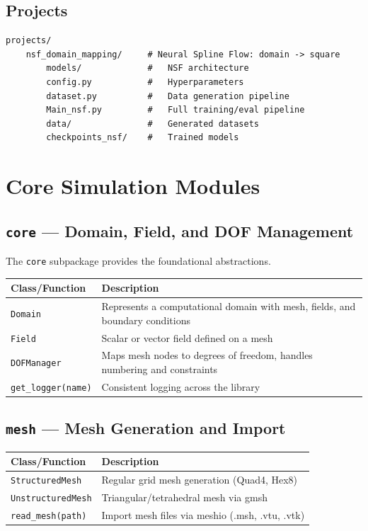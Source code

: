 \documentclass[11pt,a4paper]{report}
\begin{document}
\section{Projects}

\begin{lstlisting}[style=bash,numbers=none]
projects/
    nsf_domain_mapping/     # Neural Spline Flow: domain -> square
        models/             #   NSF architecture
        config.py           #   Hyperparameters
        dataset.py          #   Data generation pipeline
        Main_nsf.py         #   Full training/eval pipeline
        data/               #   Generated datasets
        checkpoints_nsf/    #   Trained models
\end{lstlisting}

\chapter{Core Simulation Modules}

\section{\texttt{core} --- Domain, Field, and DOF Management}

The \texttt{core} subpackage provides the foundational abstractions.

\begin{longtable}{lp{9cm}}
\toprule
\textbf{Class/Function} & \textbf{Description} \\
\midrule
\texttt{Domain} & Represents a computational domain with mesh, fields, and boundary conditions \\
\texttt{Field} & Scalar or vector field defined on a mesh \\
\texttt{DOFManager} & Maps mesh nodes to degrees of freedom, handles numbering and constraints \\
\texttt{get\_logger(name)} & Consistent logging across the library \\
\bottomrule
\end{longtable}

\section{\texttt{mesh} --- Mesh Generation and Import}

\begin{longtable}{lp{9cm}}
\toprule
\textbf{Class/Function} & \textbf{Description} \\
\midrule
\texttt{StructuredMesh} & Regular grid mesh generation (Quad4, Hex8) \\
\texttt{UnstructuredMesh} & Triangular/tetrahedral mesh via gmsh \\
\texttt{read\_mesh(path)} & Import mesh files via meshio (.msh, .vtu, .vtk) \\
\bottomrule
\end{longtable}
\end{document}
